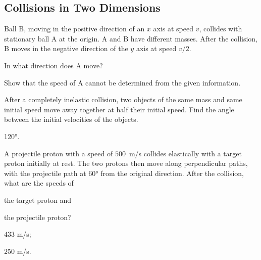 \subsection{Collisions in Two Dimensions}


\begin{problem}
	Ball B, moving in the positive direction of an $x$ axis at speed $v$, collides with stationary ball A at the origin. A and B have different masses. After the collision, B moves in the negative direction of the $y$ axis at speed $v/2$. 
	\begin{enumerate*}[label=(\alph*)]
		\item In what direction does A move?
		\item Show that the speed of A cannot be determined from the given information.
	\end{enumerate*}
\end{problem}


\begin{problem}
	After a completely inelastic collision, two objects of the same
	mass and same initial speed move away together at half their initial
	speed. Find the angle between the initial velocities of the objects.
	\begin{solution}
		\ang{120}.
	\end{solution}
\end{problem}


\begin{problem}
	A projectile proton with a speed of $500$~m/s collides elastically
	with a target proton initially at rest. The two protons then
	move along perpendicular paths, with the projectile path at \ang{60}
	from the original direction. After the collision, what are the speeds
	of 
	\begin{enumerate*}[label=(\alph*)]
		\item the target proton and
		\item the projectile proton?
	\end{enumerate*}
	\begin{solution}
		\begin{enumerate*}[label=(\alph*)]
			\item $433$ m/s; 
			\item $250$ m/s.
		\end{enumerate*}	
	\end{solution}
\end{problem}

